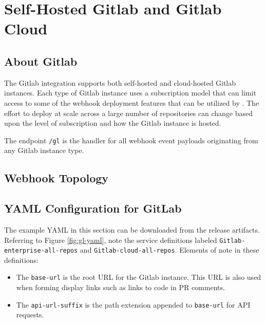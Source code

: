 \chapter{Self-Hosted Gitlab and Gitlab Cloud}


\section{About Gitlab}

The Gitlab integration supports both self-hosted and cloud-hosted Gitlab instances.  Each type
of Gitlab instance uses a subscription model that can limit access to some of the webhook
deployment features that can be utilized by \cxoneflowns. The effort to deploy \cxoneflow at scale
across a large number of repositories can change based upon the level of subscription
and how the Gitlab instance is hosted.

The \cxoneflow endpoint \texttt{/gl} is the handler for all webhook event
payloads originating from any Gitlab instance type.  


\section{Webhook Topology}




\section{\cxoneflowtext\space YAML Configuration for GitLab}

The example YAML in this section can be downloaded from the \cxoneflow release artifacts. Referring to Figure
\ref{fig:gl-yaml}, note the
service definitions labeled \texttt{Gitlab-enterprise-all-repos} and \texttt{Gitlab-cloud-all-repos}.
Elements of note in these definitions:

\begin{itemize}
    \item The \texttt{base-url} is the root URL for the Gitlab instance.  This URL is also used
    when forming display links such as links to code in PR comments.
    \item The \texttt{api-url-suffix} is the path extension appended to \texttt{base-url} for API requests.
\end{itemize}

